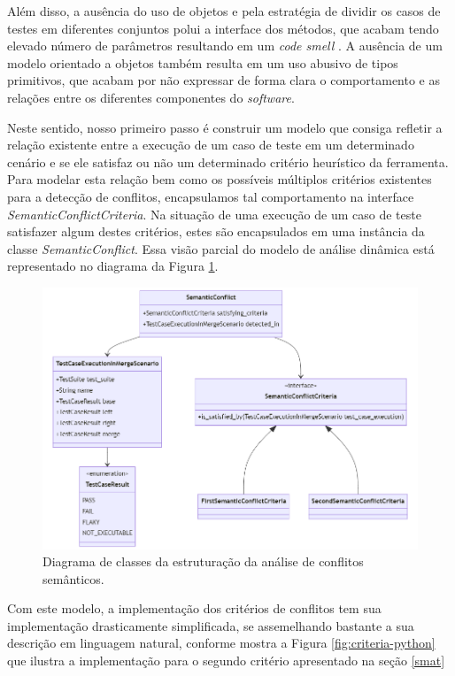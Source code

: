 \documentclass[12pt]{article}
\begin{document}
Além disso, a ausência do uso de objetos e pela estratégia de dividir os casos de testes em diferentes conjuntos polui a interface dos métodos, que acabam tendo elevado número de parâmetros resultando em um \textit{code smell} \cite{fowler2018refactoring}. A ausência de um modelo orientado a objetos também resulta em um uso abusivo de tipos primitivos, que acabam por não expressar de forma clara o comportamento e as relações entre os diferentes componentes do \textit{software}.

Neste sentido, nosso primeiro passo é construir um modelo que consiga refletir a relação existente entre a execução de um caso de teste em um determinado cenário e se ele satisfaz ou não um determinado critério heurístico da ferramenta. Para modelar esta relação bem como os possíveis múltiplos critérios existentes para a detecção de conflitos, encapsulamos tal comportamento na interface \textit{SemanticConflictCriteria}. Na situação de uma execução de um caso de teste satisfazer algum destes critérios, estes são encapsulados em uma instância da classe \textit{SemanticConflict}. Essa visão parcial do modelo de análise dinâmica está representado no diagrama da Figura \ref{fig:criteria}.

\begin{figure}[H]
    \centering
    \includegraphics[width=\textwidth]{imagens/criteria.png}
    \caption{Diagrama de classes da estruturação da análise de conflitos semânticos.}
    \label{fig:criteria}
\end{figure}

Com este modelo, a implementação dos critérios de conflitos tem sua implementação drasticamente simplificada, se assemelhando bastante a sua descrição em linguagem natural, conforme mostra a Figura \ref{fig:criteria-python} que ilustra a implementação para o segundo critério apresentado na seção \ref{smat}
\end{document}
